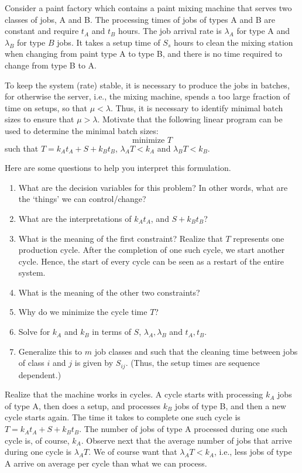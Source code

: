 \begin{exercise}
  Consider a paint factory which contains a paint mixing machine that
  serves two classes of jobs, A and B. The processing times of jobs of
  types A and B are constant and require $t_A$ and $t_B$ hours. The
  job arrival rate is $\lambda_A$ for type A and $\lambda_B$ for type
  $B$ jobs. It takes a setup time of $S_s$ hours to clean the mixing
  station when changing from paint type A to type B, and there is no
  time required to change from type B to A.

  To keep the system (rate) stable, it is necessary to produce the
  jobs in batches, for otherwise the server, i.e., the mixing machine,
  spends a too large fraction of time on setups, so that
  $\mu < \lambda$. Thus, it is necessary to identify minimal batch
  sizes to ensure that $\mu > \lambda$.  Motivate that the following linear
  program  can be used to determine the minimal batch sizes:
\begin{equation*}
  \text{minimize }  T
\end{equation*}
such that $ T=  k_A t_A + S + k_B t_B$, $\lambda_A T < k_A$ and $\lambda_B T < k_B$.
\begin{hint}
Here are some questions to help you interpret this formulation.
\begin{enumerate}
\item   What are the decision variables for this problem? In other words, what are the `things' we can control/change?
\item What are the interpretations of $k_A t_A$, and $S+k_B t_B$?
\item What is the meaning of the first constraint?  Realize that $T$
  represents one production cycle. After the completion of one such
  cycle, we start another cycle. Hence, the start of every cycle can
  be seen as a restart of the entire system.
\item   What is the meaning of the other two constraints?
\item Why do we minimize the cycle time $T$?
\item Solve for $k_A$ and $k_B$ in terms of $S$,  $\lambda_A, \lambda_B$ and $t_A, t_B$. 
\item Generalize this to $m$ job classes and such that the cleaning
  time between jobs of class $i$ and $j$ is given by $S_{i j}$. (Thus,
  the setup times are sequence dependent.) 
\end{enumerate}
\end{hint}

  \begin{solution}
    Realize that the machine works in cycles. A cycle starts with
    processing $k_A$ jobs of type A, then does a setup, and processes
    $k_B$ jobs of type B, and then a new cycle starts again.  The time
    it takes to complete one such cycle is $T=k_A t_A + S + k_B t_B$.
    The number of jobs of type A processed during one such cycle is,
    of course, $k_A$. Observe next that the average number of jobs
    that arrive during one cycle is $\lambda_A T$. We of course want
    that $\lambda_A T< k_A$, i.e., less jobs of type A arrive on
    average per cycle than what we can process.
  \end{solution}
\end{exercise}
